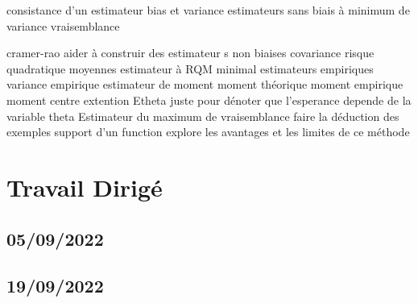\documentclass{article}
\begin{document}
consistance d'un estimateur
bias et variance
estimateurs sans biais à minimum de variance
vraisemblance

cramer-rao
aider à construir des estimateur s non biaises
covariance
risque quadratique moyennes
estimateur à RQM minimal
estimateurs empiriques
variance empirique
estimateur de moment
moment théorique
moment empirique
moment centre
extention
Etheta juste pour dénoter que l'esperance depende de la variable theta
Estimateur du maximum de vraisemblance
faire la déduction des exemples
support d'un function
explore les avantages et les limites de ce méthode


\section{Travail Dirigé}
\subsection{05/09/2022}
\subsection{19/09/2022}
\end{document}
